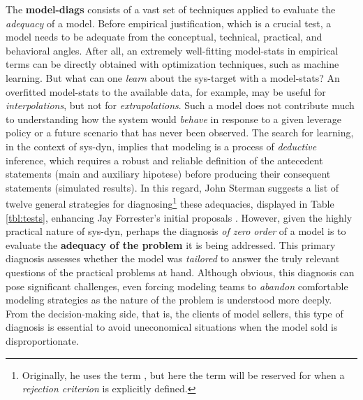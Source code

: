 \documentclass[./main_en.tex]{subfiles}
\begin{document}
\par The \textbf{\gls{model-diags}} consists of a vast set of techniques applied to evaluate the \textit{adequacy} of a \gls{model}. Before empirical justification, which is a crucial test, a \gls{model} needs to be adequate from the conceptual, technical, practical, and behavioral angles. After all, an extremely well-fitting \gls{model-stats} in empirical terms can be directly obtained with optimization techniques, such as machine learning. But what can one \textit{learn} about the \gls{sys-target} with a \gls{model-stats}? An overfitted \gls{model-stats} to the available data, for example, may be useful for \textit{interpolations}, but not for \textit{extrapolations}. Such a \gls{model} does not contribute much to understanding how the \gls{system} would \textit{behave} in response to a given leverage policy or a future scenario that has never been observed. The search for learning, in the context of \gls{sys-dyn}, implies that modeling is a process of \textit{deductive} inference, which requires a robust and reliable definition of the antecedent statements (main and auxiliary \gls{hipotese}) before producing their consequent statements (simulated results). In this regard, John Sterman suggests a list of twelve general strategies for diagnosing\footnote{Originally, he uses the term , but here the term  will be reserved for when a \textit{rejection criterion} is explicitly defined.} these adequacies, displayed in Table \ref{tbl:tests}, enhancing Jay Forrester's initial proposals \cite{sterman2000}. However, given the highly practical nature of \gls{sys-dyn}, perhaps the diagnosis \textit{of zero order} of a model is to evaluate the \textbf{adequacy of the problem} it is being addressed. This primary diagnosis assesses whether the model was \textit{tailored} to answer the truly relevant questions of the practical problems at hand. Although obvious, this diagnosis can pose significant challenges, even forcing modeling teams to \textit{abandon} comfortable modeling strategies as the nature of the problem is understood more deeply. From the decision-making side, that is, the clients of model sellers, this type of diagnosis is essential to avoid uneconomical situations when the model sold is disproportionate. 
\end{document}
